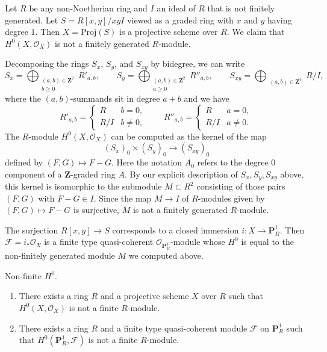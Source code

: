 \noindent
Let $R$ be any non-Noetherian ring and $I$ an ideal of $R$
that is not finitely generated. Let $S = R[x, y]/xyI$ viewed
as a graded ring with $x$ and $y$ having degree $1$.
Then $X = \text{Proj}(S)$ is a projective scheme over $R$.
We claim that $H^0(X, \mathcal{O}_X)$ is not
a finitely generated $R$-module.

\medskip\noindent
Decomposing the rings $S_x$, $S_y$, and $S_{xy}$ by bidegree,
we can write
$$
S_x = \bigoplus_{\substack{(a, b) \in \mathbf{Z}^2 \\ b \geq 0}} R'_{a, b},
\quad\quad
S_y = \bigoplus_{\substack{(a, b) \in \mathbf{Z}^2 \\ a \geq 0}} R''_{a, b},
\quad\quad
S_{xy} = \bigoplus_{\substack{(a, b) \in \mathbf{Z}^2}} R/I,
$$
where the $(a, b)$-summands sit in degree $a + b$ and we have
$$
R'_{a, b} =
\left\{
\begin{matrix}
R & b = 0, \\
R/I & b \ne 0,
\end{matrix}
\right.
\quad\quad
R''_{a, b} =
\left\{
\begin{matrix}
R & a = 0, \\
R/I & a \ne 0.
\end{matrix}
\right.
$$
The $R$-module $H^0(X, \mathcal{O}_X)$ can be computed as the kernel of the map
$$
(S_x)_0 \times (S_y)_0 \to (S_{xy})_0
$$
defined by $(F, G) \mapsto F - G$. Here the notation $A_0$ refers to the
degree $0$ component of a $\mathbf{Z}$-graded ring $A$. By our explicit
description of $S_x, S_y, S_{xy}$ above, this kernel is isomorphic
to the submodule $M \subset R^2$ consisting of those pairs $(F, G)$
with $F - G \in I$. Since the map $M \to I$ of $R$-modules
given by $(F, G) \mapsto F - G$ is surjective,
$M$ is not a finitely generated $R$-module.

\medskip\noindent
The surjection $R[x, y] \to S$ corresponds to a closed
immersion $i : X \to \mathbf{P}^1_R$. Then $\mathcal{F} = i_*\mathcal{O}_X$
is a finite type quasi-coherent $\mathcal{O}_{\mathbf{P}^1_R}$-module
whose $H^0$ is equal to the non-finitely generated module $M$
we computed above.

\begin{lemma}
\label{lemma-nonfinite-h0}
Non-finite $H^0$.
\begin{enumerate}
\item There exists a ring $R$ and a projective scheme $X$
over $R$ such that $H^0(X, \mathcal{O}_X)$ is not
a finite $R$-module.
\item There exists a ring $R$ and a finite type quasi-coherent module
$\mathcal{F}$ on $\mathbf{P}^1_R$ such that
$H^0(\mathbf{P}^1_R, \mathcal{F})$ is not a finite $R$-module.
\end{enumerate}
\end{lemma}


